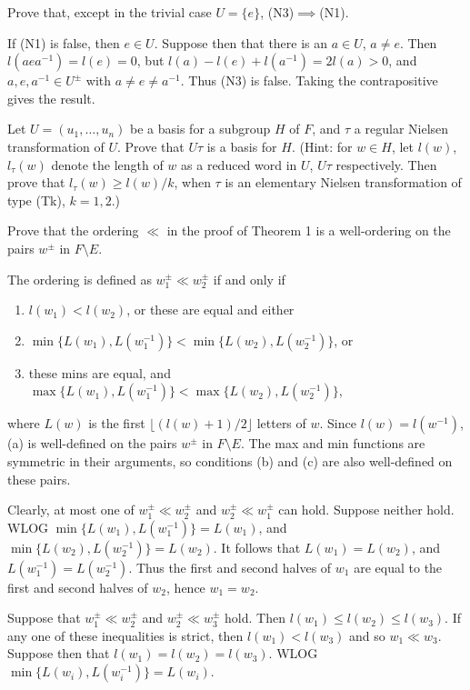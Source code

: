 \begin{questions}
\question Prove that, except in the trivial case $U=\{e\}$, (N3)$\implies$(N1).
  \begin{solution}
    If (N1) is false, then $e\in U$. Suppose then that there is an $a\in U$, $a\neq e$. Then $l(aea^{-1})=l(e)=0$, but $l(a)-l(e)+l(a^{-1})=2l(a)>0$, and $a,e,a^{-1}\in U^\pm$ with $a\neq e\neq a^{-1}$. Thus (N3) is false. Taking the contrapositive gives the result.
  \end{solution}

\question Let $U=(u_1,\ldots,u_n)$ be a basis for a subgroup $H$ of $F$, and $\tau$ a regular Nielsen transformation of $U$. Prove that $U\tau$ is a basis for $H$. (Hint: for $w\in H$, let $l(w)$, $l_\tau(w)$ denote the length of $w$ as a reduced word in $U$, $U\tau$ respectively. Then prove that $l_\tau(w)\geq l(w)/k$, when $\tau$ is an elementary Nielsen transformation of type (Tk), $k=1,2$.)

\question Prove that the ordering $\ll$ in the proof of Theorem 1 is a well-ordering on the pairs $w^\pm$ in $F\setminus E$.
  \begin{solution}
    The ordering is defined as $w_1^\pm \ll w_2^\pm$ if and only if
    \begin{enumerate}[label=(\alph*)]
    \item $l(w_1)<l(w_2)$, or these are equal and either
    \item $\min\{L(w_1),L(w_1^{-1})\}<\min\{L(w_2),L(w_2^{-1})\}$, or
    \item these mins are equal, and $\max\{L(w_1), L(w_1^{-1})\}<\max\{L(w_2), L(w_2^{-1})\}$,
    \end{enumerate}
    where $L(w)$ is the first $\lfloor (l(w)+1)/2 \rfloor$ letters of $w$. Since $l(w)=l(w^{-1})$, (a) is well-defined on the pairs $w^\pm$ in $F\setminus E$. The max and min functions are symmetric in their arguments, so conditions (b) and (c) are also well-defined on these pairs.

    Clearly, at most one of $w_1^\pm\ll w_2^\pm$ and $w_2^\pm \ll w_1^\pm$ can hold. Suppose neither hold. WLOG $\min\{L(w_1),L(w_1^{-1})\}=L(w_1)$, and $\min\{L(w_2),L(w_2^{-1})\}=L(w_2)$. It follows that $L(w_1)=L(w_2)$, and $L(w_1^{-1})=L(w_2^{-1})$. Thus the first and second halves of $w_1$ are equal to the first and second halves of $w_2$, hence $w_1=w_2$.

    Suppose that $w_1^\pm\ll w_2^\pm$ and $w_2^\pm\ll w_3^\pm$ hold. Then $l(w_1)\leq l(w_2)\leq l(w_3)$. If any one of these inequalities is strict, then $l(w_1)<l(w_3)$ and so $w_1\ll w_3$. Suppose then that $l(w_1)=l(w_2)=l(w_3)$. WLOG $\min\{L(w_i),L(w_i^{-1})\}=L(w_i)$.


\end{solution}
\end{questions}
